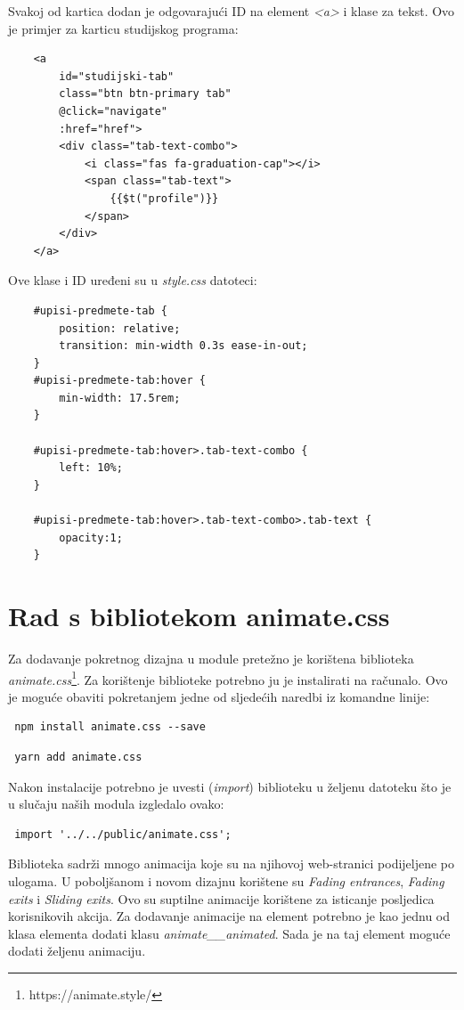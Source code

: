 \documentclass[times, utf8, zavrsni, numeric]{fer}
\begin{document}
    Svakoj od kartica dodan je odgovarajući ID na element \textit{<a>} i klase za tekst. Ovo je primjer za karticu studijskog programa:
    \begin{verbatim}
    <a
        id="studijski-tab"
        class="btn btn-primary tab"
        @click="navigate"
        :href="href">
        <div class="tab-text-combo">
            <i class="fas fa-graduation-cap"></i>
            <span class="tab-text"> 
                {{$t("profile")}}
            </span>
        </div>
    </a>
    \end{verbatim}
    
    Ove klase i ID uređeni su u \textit{style.css} datoteci:
    \begin{verbatim}
    #upisi-predmete-tab {
        position: relative;
        transition: min-width 0.3s ease-in-out;
    }
    #upisi-predmete-tab:hover {
        min-width: 17.5rem;
    }

    #upisi-predmete-tab:hover>.tab-text-combo {
        left: 10%;
    }

    #upisi-predmete-tab:hover>.tab-text-combo>.tab-text {
        opacity:1;
    }
    \end{verbatim}
    \section{Rad s bibliotekom animate.css}
    Za dodavanje pokretnog dizajna u module pretežno je korištena biblioteka \textit{animate.css}\footnote{https://animate.style/}. Za korištenje biblioteke potrebno ju je instalirati na računalo. Ovo je moguće obaviti pokretanjem jedne od sljedećih naredbi iz komandne linije:
    \begin{verbatim} npm install animate.css --save \end{verbatim}
    \begin{verbatim} yarn add animate.css \end{verbatim}
    Nakon instalacije potrebno je uvesti (\textit{import}) biblioteku u željenu datoteku što je u slučaju naših modula izgledalo ovako: \begin{verbatim} import '../../public/animate.css';\end{verbatim} 
    
    Biblioteka sadrži mnogo animacija koje su na njihovoj web-stranici podijeljene po ulogama. U poboljšanom i novom dizajnu korištene su \textit{Fading entrances}, \textit{Fading exits} i \textit{Sliding exits}. Ovo su suptilne animacije korištene za isticanje posljedica korisnikovih akcija. Za dodavanje animacije na element potrebno je kao jednu od klasa elementa dodati klasu \textit{animate\_\_animated}. Sada je na taj element moguće dodati željenu animaciju.
    
\end{document}
